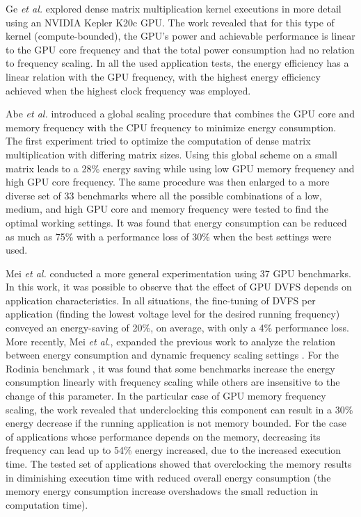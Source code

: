 Ge \textit{et al.} \cite{ge_effects_2013} explored dense matrix multiplication kernel executions in more detail using an NVIDIA Kepler K20c GPU.  The work revealed that for this type of kernel (compute-bounded), the GPU's power and achievable performance is linear to the GPU core frequency and that the total power consumption had no relation to frequency scaling. In all the used application tests, the energy efficiency has a linear relation with the GPU frequency, with the highest energy efficiency achieved when the highest clock frequency was employed.

Abe \textit{et al.} \cite{abe_power_2012} introduced a global scaling procedure that combines the GPU core and memory frequency with the CPU frequency to minimize energy consumption. The first experiment tried to optimize the computation of dense matrix multiplication with differing matrix sizes. Using this global scheme on a small matrix leads to a 28\% energy saving while using low GPU memory frequency and high GPU core frequency. The same procedure was then enlarged to a more diverse set of 33 benchmarks where all the possible combinations of a low, medium, and high GPU core and memory frequency were tested to find the optimal working settings. It was found that energy consumption can be reduced as much as 75\% with a performance loss of 30\% when the best settings were used. 

Mei \textit{et al.} \cite{mei_measurement_2013} conducted a more general experimentation using 37 GPU benchmarks. In this work, it was possible to observe that the effect of GPU DVFS depends on application characteristics. In all situations, the fine-tuning of DVFS per application (finding the lowest voltage level for the desired running frequency) conveyed an energy-saving of 20\%, on average, with only a 4\% performance loss. More recently, Mei  \textit{et al.}, expanded the previous work to analyze the relation between energy consumption and dynamic frequency scaling settings \cite{mei_survey_2016}. For the  Rodinia benchmark \cite{che_rodinia:_2009}, it was found that some benchmarks increase the energy consumption linearly with frequency scaling while others are insensitive to the change of this parameter. In the particular case of GPU memory frequency scaling, the work revealed that underclocking this component can result in a 30\% energy decrease if the running application is not memory bounded. For the case of applications whose performance depends on the memory, decreasing its frequency can lead up to 54\% energy increased, due to the increased execution time. The tested set of applications showed that overclocking the memory results in diminishing execution time with reduced overall energy consumption (the memory energy consumption increase overshadows the small reduction in computation time). 

